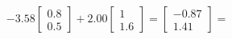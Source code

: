 \documentclass[preview]{standalone}
\begin{document}
\begin{align*}
-3.58 \begin{bmatrix} 0.8 \\ 0.5 \end{bmatrix} + 2.00 \begin{bmatrix} 1 \\ 1.6 \end{bmatrix} = \begin{bmatrix} -0.87 \\ 1.41 \end{bmatrix} =
\end{align*}
\end{document}

